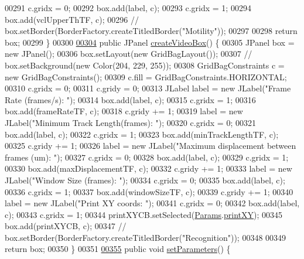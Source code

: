 \begin{DoxyCode}
{00291     c.gridx = 0;
00292     box.add(label, c);
00293     c.gridx = 1;
00294     box.add(vclUpperThTF, c);
00296     \textcolor{comment}{// box.setBorder(BorderFactory.createTitledBorder("Motility"));}
00297 
00298     \textcolor{keywordflow}{return} box;
00299   \}
00300 
\hypertarget{_settings_window_8java_source_l00304}{}\hyperlink{classgui_1_1_settings_window_abfe7515fa4028f1aa2cc483ae44f2fc0}{00304}   \textcolor{keyword}{public} JPanel \hyperlink{classgui_1_1_settings_window_abfe7515fa4028f1aa2cc483ae44f2fc0}{createVideoBox}() \{
00305     JPanel box = \textcolor{keyword}{new} JPanel();
00306     box.setLayout(\textcolor{keyword}{new} GridBagLayout());
00307     \textcolor{comment}{// box.setBackground(new Color(204, 229, 255));}
00308     GridBagConstraints c = \textcolor{keyword}{new} GridBagConstraints();
00309     c.fill = GridBagConstraints.HORIZONTAL;
00310     c.gridx = 0;
00311     c.gridy = 0;
00313     JLabel label = \textcolor{keyword}{new} JLabel(\textcolor{stringliteral}{"Frame Rate (frames/s): "});
00314     box.add(label, c);
00315     c.gridx = 1;
00316     box.add(frameRateTF, c);
00318     c.gridy += 1;
00319     label = \textcolor{keyword}{new} JLabel(\textcolor{stringliteral}{"Minimum Track Length(frames): "});
00320     c.gridx = 0;
00321     box.add(label, c);
00322     c.gridx = 1;
00323     box.add(minTrackLengthTF, c);
00325     c.gridy += 1;
00326     label = \textcolor{keyword}{new} JLabel(\textcolor{stringliteral}{"Maximum displacement between frames (um): "});
00327     c.gridx = 0;
00328     box.add(label, c);
00329     c.gridx = 1;
00330     box.add(maxDisplacementTF, c);
00332     c.gridy += 1;
00333     label = \textcolor{keyword}{new} JLabel(\textcolor{stringliteral}{"Window Size (frames): "});
00334     c.gridx = 0;
00335     box.add(label, c);
00336     c.gridx = 1;
00337     box.add(windowSizeTF, c);
00339     c.gridy += 1;
00340     label = \textcolor{keyword}{new} JLabel(\textcolor{stringliteral}{"Print XY coords: "});
00341     c.gridx = 0;
00342     box.add(label, c);
00343     c.gridx = 1;
00344     printXYCB.setSelected(\hyperlink{classdata_1_1_params}{Params}.\hyperlink{classdata_1_1_params_ae8b85275ab9c5375a3d35dcb7cd8332f}{printXY});
00345     box.add(printXYCB, c);
00347     \textcolor{comment}{// box.setBorder(BorderFactory.createTitledBorder("Recognition"));}
00348 
00349     \textcolor{keywordflow}{return} box;
00350   \}
00351 
\hypertarget{_settings_window_8java_source_l00355}{}\hyperlink{classgui_1_1_settings_window_a1d6c94586a33965dd4277c7fe62de430}{00355}   \textcolor{keyword}{public} \textcolor{keywordtype}{void} \hyperlink{classgui_1_1_settings_window_a1d6c94586a33965dd4277c7fe62de430}{setParameters}() \{
}
\end{DoxyCode}
